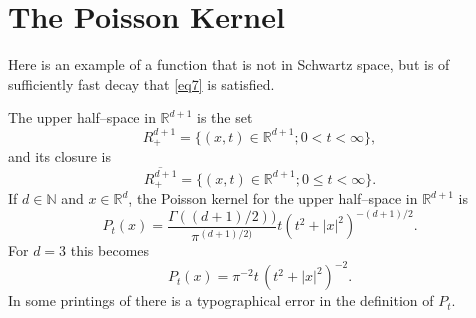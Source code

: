 \documentclass[english, reqno]{amsart}
\newcommand{\IR}{\text{${\mathbb{R}}$}}
\newcommand{\IN}{\text{${\mathbb{N}}$}}
\begin{document}
\section{The Poisson Kernel} \label{section 5}
Here is an example of a function that is not in Schwartz space, but is of sufficiently fast decay that \eqref{eq7} is satisfied.

The upper half--space in $\IR^{d+1}$ is the set 
\[
R_+^{d+1}=\{(x,t) \in \IR^{d+1}; 0 < t < \infty\},
\]
and its closure is
\[
\overline{R_+^{d+1}}=\{(x,t) \in \IR^{d+1}; 0  \le t < \infty\}.
\]
If $d \in \IN$ and $x \in \IR^d$,  the Poisson kernel for the upper half--space in $\IR^{d+1}$ is
\[
P_t(x)=\frac{\Gamma( (d+1)/2) )}{\pi^{(d+1)/2)}} {t(t^2+|x|^2)^{-(d+1)/2}}. 
\]
For $d=3$ this becomes
\begin{equation} \label{eq14}
P_t(x)=\pi^{-2} t\, (t^2+|x|^2)^{-2}.
\end{equation}
In some printings of \cite{Fo1} there is a typographical error in the definition of $P_t$.
\end{document}
